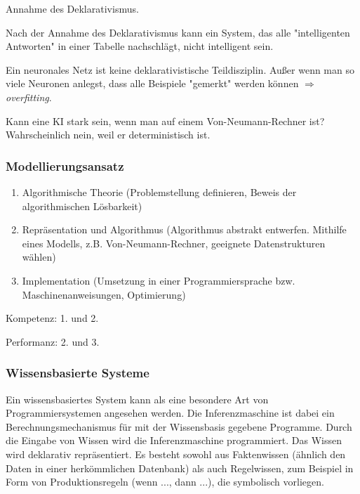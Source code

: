 \documentclass[runningheads,deutsch]{llncs}
\begin{document}
\begin{definition}{Annahme des Deklarativismus.}

    Nach der Annahme des Deklarativismus kann ein System, das alle "intelligenten Antworten" in einer Tabelle nachschlägt, nicht intelligent sein.
\end{definition}

\begin{remark}
    Ein neuronales Netz ist keine deklarativistische Teildisziplin. Außer wenn man so viele Neuronen anlegst, dass alle Beispiele "gemerkt" werden können $\Rightarrow$ \textit{overfitting}.  
\end{remark}


\begin{remark}{Kann eine KI stark sein, wenn man auf einem Von-Neumann-Rechner ist?}
    Wahrscheinlich nein, weil er deterministisch ist.
\end{remark}

\subsubsection{Modellierungsansatz}

\begin{enumerate}
    \item Algorithmische Theorie (Problemstellung definieren, Beweis der algorithmischen Lösbarkeit)

    \item Repräsentation und Algorithmus (Algorithmus abstrakt entwerfen. Mithilfe eines Modells, z.B. Von-Neumann-Rechner, geeignete Datenstrukturen wählen)

    \item Implementation (Umsetzung in einer Programmiersprache bzw. Maschinenanweisungen, Optimierung)
\end{enumerate}

Kompetenz: 1. und 2.

Performanz: 2. und 3.

\subsubsection{Wissensbasierte Systeme}

Ein wissensbasiertes System kann als eine besondere Art von Programmiersystemen angesehen werden. Die Inferenzmaschine ist dabei ein Berechnungsmechanismus für mit der Wissensbasis gegebene Programme. Durch die Eingabe von Wissen wird die Inferenzmaschine programmiert. Das Wissen wird deklarativ repräsentiert. Es besteht sowohl aus Faktenwissen (ähnlich den Daten in einer herkömmlichen Datenbank) als auch Regelwissen, zum Beispiel in Form von Produktionsregeln (wenn ..., dann ...), die symbolisch vorliegen. 
\end{document}
